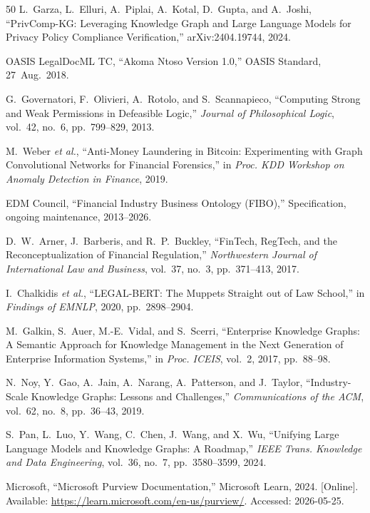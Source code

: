 \documentclass{ieeeaccess}
\begin{document}
\begin{thebibliography}{50}
L.~Garza, L.~Elluri, A.~Piplai, A.~Kotal, D.~Gupta, and A.~Joshi, ``PrivComp-KG: Leveraging Knowledge Graph and Large Language Models for Privacy Policy Compliance Verification,'' arXiv:2404.19744, 2024.

OASIS LegalDocML TC, ``Akoma Ntoso Version 1.0,'' OASIS Standard, 27~Aug.~2018.

G.~Governatori, F.~Olivieri, A.~Rotolo, and S.~Scannapieco, ``Computing Strong and Weak Permissions in Defeasible Logic,'' \textit{Journal of Philosophical Logic}, vol.~42, no.~6, pp.~799--829, 2013.

M.~Weber \textit{et al.}, ``Anti-Money Laundering in Bitcoin: Experimenting with Graph Convolutional Networks for Financial Forensics,'' in \textit{Proc. KDD Workshop on Anomaly Detection in Finance}, 2019.

EDM Council, ``Financial Industry Business Ontology (FIBO),'' Specification, ongoing maintenance, 2013--2026.

D.~W.~Arner, J.~Barberis, and R.~P.~Buckley, ``FinTech, RegTech, and the Reconceptualization of Financial Regulation,'' \textit{Northwestern Journal of International Law and Business}, vol.~37, no.~3, pp.~371--413, 2017.

I.~Chalkidis \textit{et al.}, ``LEGAL-BERT: The Muppets Straight out of Law School,'' in \textit{Findings of EMNLP}, 2020, pp.~2898--2904.

M.~Galkin, S.~Auer, M.-E.~Vidal, and S.~Scerri, ``Enterprise Knowledge Graphs: A Semantic Approach for Knowledge Management in the Next Generation of Enterprise Information Systems,'' in \textit{Proc. ICEIS}, vol.~2, 2017, pp.~88--98.

N.~Noy, Y.~Gao, A.~Jain, A.~Narang, A.~Patterson, and J.~Taylor, ``Industry-Scale Knowledge Graphs: Lessons and Challenges,'' \textit{Communications of the ACM}, vol.~62, no.~8, pp.~36--43, 2019.

S.~Pan, L.~Luo, Y.~Wang, C.~Chen, J.~Wang, and X.~Wu, ``Unifying Large Language Models and Knowledge Graphs: A Roadmap,'' \textit{IEEE Trans. Knowledge and Data Engineering}, vol.~36, no.~7, pp.~3580--3599, 2024.

Microsoft, ``Microsoft Purview Documentation,'' Microsoft Learn, 2024. [Online]. Available: \url{https://learn.microsoft.com/en-us/purview/}. Accessed: 2026-05-25.


\end{thebibliography}
\end{document}
